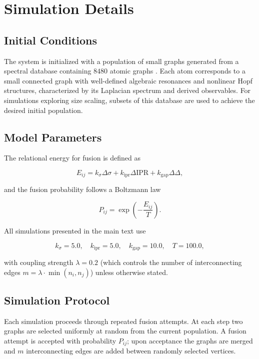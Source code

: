 \documentclass[11pt]{article}
\begin{document}
\section{Simulation Details}

\subsection{Initial Conditions}

The system is initialized with a population of small graphs generated from a spectral database containing $8480$ atomic graphs \cite{gonzalez2025algebraic}. 
Each atom corresponds to a small connected graph with well-defined algebraic resonances and nonlinear Hopf structures, characterized by its Laplacian spectrum and derived observables. 
For simulations exploring size scaling, subsets of this database are used to achieve the desired initial population.

\subsection{Model Parameters}

The relational energy for fusion is defined as

\[
E_{ij} = k_\sigma \Delta\sigma + k_{\mathrm{ipr}} \Delta\mathrm{IPR} + k_{\mathrm{gap}} \Delta\Delta,
\]

and the fusion probability follows a Boltzmann law

\[
P_{ij} = \exp\left( - \frac{E_{ij}}{T} \right).
\]

All simulations presented in the main text use

\[
k_\sigma = 5.0,\quad k_{\mathrm{ipr}} = 5.0,\quad k_{\mathrm{gap}} = 10.0,\quad T = 100.0,
\]

with coupling strength $\lambda = 0.2$ (which controls the number of interconnecting edges $m = \lambda \cdot \min(n_i,n_j)$) unless otherwise stated.

\subsection{Simulation Protocol}

Each simulation proceeds through repeated fusion attempts. 
At each step two graphs are selected uniformly at random from the current population. 
A fusion attempt is accepted with probability $P_{ij}$; upon acceptance the graphs are merged and $m$ interconnecting edges are added between randomly selected vertices.
\end{document}

